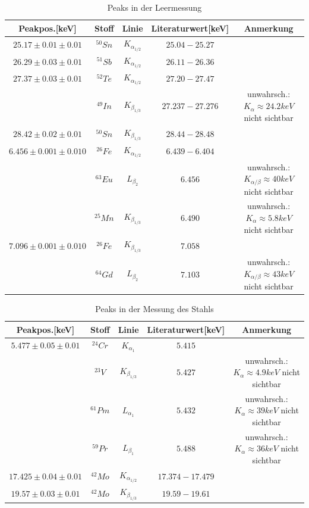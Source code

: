 \documentclass[12pt,a4paper]{article}
\begin{document}
\begin{table}
\center
\begin{tabular}{|c|c|c|c|c|}
\hline 
Peakpos.[keV] & Stoff & Linie & Literaturwert[keV] & Anmerkung \\
\hline 
$25.17\pm 0.01\pm 0.01$& $^{50}Sn$ & $K_{\alpha_{1/2}}$ & $25.04-25.27$ & \\ 
\hline 
$26.29\pm 0.03\pm 0.01$ & $^{51}Sb$ & $K_{\alpha_{1/2}}$ & $26.11-26.36$ & \\ 
\hline 
$27.37\pm 0.03\pm 0.01$ & $^{52}Te$ & $K_{\alpha_{1/2}}$ & $27.20-27.47$ & \\ 
 & $^{49}In$ & $K_{\beta_{1/3}}$ & $27.237-27.276$ & unwahrsch.: $K_{\alpha}\approx 24.2keV$ nicht sichtbar\\ 
\hline 
$28.42\pm 0.02\pm 0.01$ & $^{50}Sn$ & $K_{\beta_{1/3}}$ & $28.44-28.48$ &\\ 
\hline 
$6.456\pm 0.001\pm 0.010$ & $^{26}Fe$ & $K_{\alpha_{1/2}}$ & $6.439-6.404$ &\\ 
& $^{63}Eu$ & $L_{\beta_{2}}$ & $6.456$ & unwahrsch.: $K_{\alpha/\beta}\approx 40keV$ nicht sichtbar\\
& $^{25}Mn$ & $K_{\beta_{1/3}}$ & $6.490$ & unwahrsch.: $K_{\alpha}\approx 5.8keV$ nicht sichtbar\\
\hline 
$7.096\pm 0.001\pm 0.010$ & $^{26}Fe$ & $K_{\beta_{1/3}}$ & $7.058$ & \\ 
& $^{64}Gd$ & $L_{\beta_{2}}$ & $7.103$ & unwahrsch.:$K_{\alpha/\beta}\approx 43keV$ nicht sichtbar\\
\hline 
\end{tabular} 
\caption{Peaks in der Leermessung}
\label{tab:a_peaks_leer}
\end{table}

\begin{table}
\center
\begin{tabular}{|c|c|c|c|c|}
\hline 
Peakpos.[keV] & Stoff & Linie & Literaturwert[keV] & Anmerkung \\
\hline 
$5.477\pm 0.05\pm 0.01$& $^{24}Cr$ & $K_{\alpha_{1}}$ & $5.415$ & \\ 
& $^{23}V$ & $K_{\beta_{1/3}}$ & $5.427$ & unwahrsch.: $K_{\alpha}\approx 4.9keV$ nicht sichtbar\\ 
& $^{61}Pm$ & $L_{\alpha_{1}}$ & $5.432$ & unwahrsch.: $K_{\alpha}\approx 39keV$ nicht sichtbar\\ 
& $^{59}Pr$ & $L_{\beta_{1}}$ & $5.488$ & unwahrsch.: $K_{\alpha}\approx 36keV$ nicht sichtbar\\ 
\hline 
$17.425\pm 0.04\pm 0.01$ & $^{42}Mo$ & $K_{\alpha_{1/2}}$ & $17.374-17.479$ & \\ 
\hline 
$19.57\pm 0.03\pm 0.01$ & $^{42}Mo$ & $K_{\beta_{1/3}}$ & $19.59-19.61$ & \\
 \hline 
\end{tabular} 
\caption{Peaks in der Messung des Stahls}
\label{tab:a_peaks_stahl}
\end{table}
\end{document}
